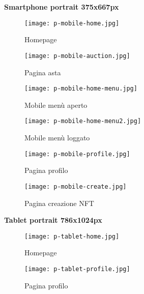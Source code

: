 \clearpage

\bigbreak
\noindent
\textbf{Smartphone portrait 375x667px}

\begin{figure}[H]
	\centering
	\begin{minipage}[b]{0.48\textwidth}
		\centering
		\texttt{[image: p-mobile-home.jpg]}
		\caption{Homepage}
		\label{fig:pMobileHome}
	\end{minipage}
	\begin{minipage}[b]{0.48\textwidth}
		\centering
		\texttt{[image: p-mobile-auction.jpg]}
		\caption{Pagina asta}
		\label{fig:pMobileAuction}
	\end{minipage}	
\end{figure}

\begin{figure}[H]
	\centering
	\begin{minipage}[b]{0.48\textwidth}
		\centering
		\texttt{[image: p-mobile-home-menu.jpg]}
		\caption{Mobile menù aperto}
		\label{fig:pMobileHomeMenu}
	\end{minipage}
	\begin{minipage}[b]{0.48\textwidth}
		\centering
		\texttt{[image: p-mobile-home-menu2.jpg]}
		\caption{Mobile menù loggato}
		\label{fig:pMobileHomeMenu2}
	\end{minipage}	
\end{figure}

\begin{figure}[H]
	\centering
	\begin{minipage}[b]{0.48\textwidth}
		\centering
		\texttt{[image: p-mobile-profile.jpg]}
		\caption{Pagina profilo}
		\label{fig:pMobileProfile}
	\end{minipage}	
	\begin{minipage}[b]{0.48\textwidth}
		\centering
		\texttt{[image: p-mobile-create.jpg]}
		\caption{Pagina creazione NFT}
		\label{fig:pMobileCreate}
	\end{minipage}
\end{figure}

\clearpage

\bigbreak
\noindent
\textbf{Tablet portrait 786x1024px}

\begin{figure}[H]
	\centering
	\begin{minipage}[b]{0.48\textwidth}
		\centering
		\texttt{[image: p-tablet-home.jpg]}
		\caption{Homepage}
		\label{fig:pTabletHome}
	\end{minipage}	
	\begin{minipage}[b]{0.48\textwidth}
		\centering
		\texttt{[image: p-tablet-profile.jpg]}
		\caption{Pagina profilo}
		\label{fig:pTabletProfile}
	\end{minipage}
\end{figure}

